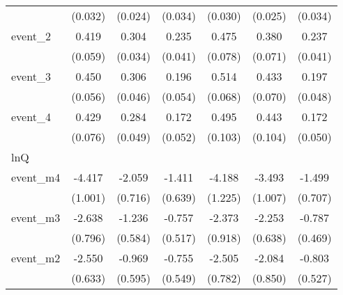 {\begin{tabular}{l*{6}{c}}
            &     (0.032)         &     (0.024)         &     (0.034)         &     (0.030)         &     (0.025)         &     (0.034)         \\
[1em]
event\_2     &       0.419\sym{***}&       0.304\sym{***}&       0.235\sym{***}&       0.475\sym{***}&       0.380\sym{***}&       0.237\sym{***}\\
            &     (0.059)         &     (0.034)         &     (0.041)         &     (0.078)         &     (0.071)         &     (0.041)         \\
[1em]
event\_3     &       0.450\sym{***}&       0.306\sym{***}&       0.196\sym{***}&       0.514\sym{***}&       0.433\sym{***}&       0.197\sym{***}\\
            &     (0.056)         &     (0.046)         &     (0.054)         &     (0.068)         &     (0.070)         &     (0.048)         \\
[1em]
event\_4     &       0.429\sym{***}&       0.284\sym{***}&       0.172\sym{***}&       0.495\sym{***}&       0.443\sym{***}&       0.172\sym{***}\\
            &     (0.076)         &     (0.049)         &     (0.052)         &     (0.103)         &     (0.104)         &     (0.050)         \\
\hline
lnQ         &                     &                     &                     &                     &                     &                     \\
event\_m4    &      -4.417\sym{***}&      -2.059\sym{**} &      -1.411\sym{*}  &      -4.188\sym{***}&      -3.493\sym{***}&      -1.499\sym{*}  \\
            &     (1.001)         &     (0.716)         &     (0.639)         &     (1.225)         &     (1.007)         &     (0.707)         \\
[1em]
event\_m3    &      -2.638\sym{***}&      -1.236\sym{*}  &      -0.757         &      -2.373\sym{**} &      -2.253\sym{***}&      -0.787         \\
            &     (0.796)         &     (0.584)         &     (0.517)         &     (0.918)         &     (0.638)         &     (0.469)         \\
[1em]
event\_m2    &      -2.550\sym{***}&      -0.969         &      -0.755         &      -2.505\sym{**} &      -2.084\sym{*}  &      -0.803         \\
            &     (0.633)         &     (0.595)         &     (0.549)         &     (0.782)         &     (0.850)         &     (0.527)         \\

\end{tabular}}
